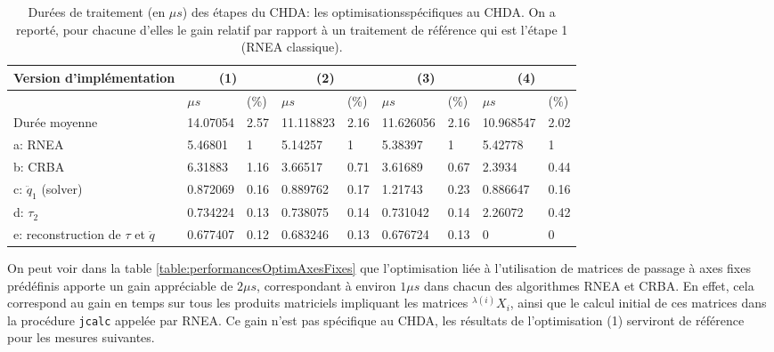 \documentclass{report}
\begin{document}
\begin{flushleft}
\begin{table}[H]
\begin{center}
\begin{tabular}[H]{|l|l|l|l|l|l|l|l|l|}
\hline
Version d'implémentation                   & \multicolumn{2}{c|}{(1)}  & \multicolumn{2}{c|}{(2)} & \multicolumn{2}{c|}{(3)} & \multicolumn{2}{c|}{(4)} \\ \hline \hline
                                           & $\mu s$      & (\%)      & $\mu s$     & (\%)   & $\mu s$     & (\%)   & $\mu s$   & (\%) \\ \hline
Durée moyenne                              & 14.07054     & 2.57      & 11.118823   & 2.16   & 11.626056   & 2.16   & 10.968547 & 2.02 \\
a: RNEA                                    & 5.46801      & 1         & 5.14257     & 1      & 5.38397     & 1      & 5.42778   & 1    \\
b: CRBA                                    & 6.31883      & 1.16      & 3.66517     & 0.71   & 3.61689     & 0.67   & 2.3934    & 0.44 \\
c: $\ddot{q}_1$ (solver)                   & 0.872069     & 0.16      & 0.889762    & 0.17   & 1.21743     & 0.23   & 0.886647  & 0.16 \\
d: $\tau_2$                                & 0.734224     & 0.13      & 0.738075    & 0.14   & 0.731042    & 0.14   & 2.26072   & 0.42 \\
e: reconstruction de $\tau$ et $\ddot{q}$  & 0.677407     & 0.12      & 0.683246    & 0.13   & 0.676724    & 0.13   & 0         & 0    \\
\hline
\end{tabular}
\caption[Table caption text]{Durées de traitement (en $\mu s$) des étapes du CHDA: les optimisationsspécifiques au CHDA. On a reporté, pour chacune d'elles le gain relatif par rapport à un traitement de référence qui est l'étape 1 (RNEA classique).}
\label{table:performancesOptimSpecifCHDA}
\end{center}
\end{table}

\end{flushleft}

On peut voir dans la table \ref{table:performancesOptimAxesFixes} que l'optimisation liée à l'utilisation de matrices de passage à axes fixes prédéfinis apporte un gain appréciable de $2\mu s$, correspondant à environ $1\mu s$ dans chacun des algorithmes RNEA et CRBA. En effet, cela correspond au gain en temps sur tous les produits matriciels impliquant les matrices $^{\lambda(i)}X_i$, ainsi que le calcul initial de ces matrices dans la procédure \verb;jcalc; appelée par RNEA. Ce gain n'est pas spécifique au CHDA, les résultats de l'optimisation (1) serviront de référence pour les mesures suivantes.
\end{document}

